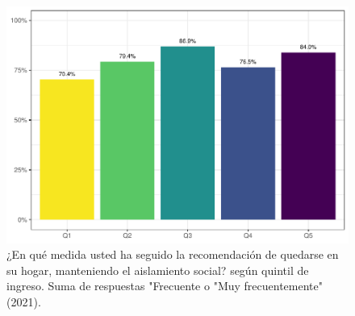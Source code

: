 \documentclass[
  12pt,
]{book}
\begin{document}
\begin{figure}

{\centering \includegraphics{reporte-elsoc_files/figure-latex/dist-quintil-1} 

}

\caption{¿En qué medida usted ha seguido la recomendación de quedarse en su hogar, manteniendo el aislamiento social? según quintil de ingreso. Suma de respuestas "Frecuente o "Muy frecuentemente" (2021).}\label{fig:dist-quintil}
\end{figure}
\end{document}
